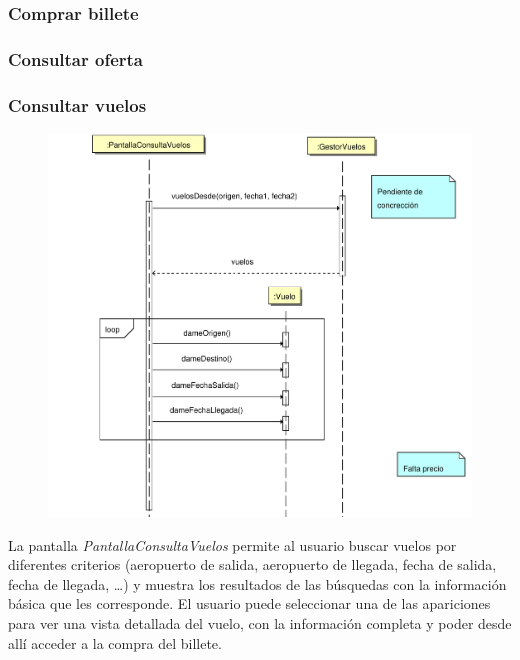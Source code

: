 \documentclass[11pt, a4paper, twoside, titlepage]{article}
\begin{document}
			\subsubsection{Comprar billete}
				\begin{figure}[H]\centering
				\end{figure}

			\subsubsection{Consultar oferta}
				\begin{figure}[H]\centering
				\end{figure}

			\subsubsection{Consultar vuelos}
				\begin{figure}[H]\centering
					\includegraphics[scale=.7]{diagramas/consultarvuelos.pdf}
				\end{figure}

				La pantalla {\itshape PantallaConsultaVuelos} permite al usuario buscar vuelos por diferentes criterios (aeropuerto de salida, aeropuerto de llegada, fecha de salida, fecha de llegada, \ldots) y muestra los resultados de las búsquedas con la información básica que les corresponde. El usuario puede seleccionar una de las apariciones para ver una vista detallada del vuelo, con la información completa y poder desde allí acceder a la compra del billete.
\end{document}

